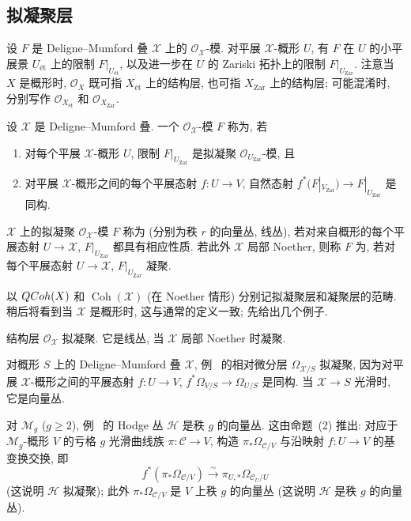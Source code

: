 \subsection{拟凝聚层}\label{src:5.1.3-subsection}
设 $F$ 是 Deligne--Mumford 叠 $\mathcal X$ 上的 $\mathcal O_{\mathcal X}$-模. 对平展 $\mathcal X$-概形 $U$, 有 $F$ 在 $U$ 的小平展景 $U_{\text{ét}}$ 上的限制 $F|_{U_{\text{ét}}}$, 以及进一步在 $U$ 的 Zariski 拓扑上的限制 $F|_{U_{\mathrm{Zar}}}$. 注意当 $X$ 是概形时, $\mathcal O_X$ 既可指 $X_{\text{ét}}$ 上的结构层, 也可指 $X_{\mathrm{Zar}}$ 上的结构层; 可能混淆时, 分别写作 $\mathcal O_{X_{\text{ét}}}$ 和 $\mathcal O_{X_{\mathrm{Zar}}}$.
\begin{definition}\label{src:5.1.17}
设 $\mathcal X$ 是 Deligne--Mumford 叠. 一个 $\mathcal O_{\mathcal X}$-模 $F$ 称为, 若
\begin{enumerate}[(1)]
\item 对每个平展 $\mathcal X$-概形 $U$, 限制 $F|_{U_{\mathrm{Zar}}}$ 是拟凝聚 $\mathcal O_{U_{\mathrm{Zar}}}$-模, 且
\item 对平展 $\mathcal X$-概形之间的每个平展态射 $f:U\to V$, 自然态射 $f^*(F|_{V_{\mathrm{Zar}}})\to F|_{U_{\mathrm{Zar}}}$ 是同构.
\end{enumerate}
$\mathcal X$ 上的拟凝聚 $\mathcal O_{\mathcal X}$-模 $F$ 称为 (分别为秩 $r$ 的向量丛, 线丛), 若对来自概形的每个平展态射 $U\to\mathcal X$, $F|_{U_{\mathrm{Zar}}}$ 都具有相应性质. 若此外 $\mathcal X$ 局部 Noether, 则称 $F$ 为, 若对每个平展态射 $U\to\mathcal X$, $F|_{U_{\mathrm{Zar}}}$ 凝聚.
\end{definition}
以 $QCoh(X)$ 和 $\operatorname{Coh}(\mathcal X)$ (在 Noether 情形) 分别记拟凝聚层和凝聚层的范畴. 稍后将看到当 $\mathcal X$ 是概形时, 这与通常的定义一致; 先给出几个例子.
\begin{example}\label{src:5.1.18}
结构层 $\mathcal O_{\mathcal X}$ 拟凝聚. 它是线丛, 当 $\mathcal X$ 局部 Noether 时凝聚.
\end{example}
\begin{example}\label{src:5.1.19}
对概形 $S$ 上的 Deligne--Mumford 叠 $\mathcal X$, 例~ 的相对微分层 $\Omega_{\mathcal X/S}$ 拟凝聚, 因为对平展 $\mathcal X$-概形之间的平展态射 $f:U\to V$, $f^*\Omega_{V/S}\to\Omega_{U/S}$ 是同构. 当 $\mathcal X\to S$ 光滑时, 它是向量丛.
\end{example}
\begin{example}\label{src:5.1.20}
对 $\mathcal M_g$ ($g\geq2$), 例~ 的 Hodge 丛 $\mathcal H$ 是秩 $g$ 的向量丛. 这由命题~(2) 推出: 对应于 $\mathcal M_g$-概形 $V$ 的亏格 $g$ 光滑曲线族 $\pi:\mathcal C\to V$, 构造 $\pi_*\Omega_{\mathcal C/V}$ 与沿映射 $f:U\to V$ 的基变换交换, 即
\[
f^*(\pi_*\Omega_{\mathcal C/V})\xrightarrow{\sim}\pi_{U,*}\Omega_{\mathcal C_U/U}
\]
(这说明 $\mathcal H$ 拟凝聚); 此外 $\pi_*\Omega_{\mathcal C/V}$ 是 $V$ 上秩 $g$ 的向量丛 (这说明 $\mathcal H$ 是秩 $g$ 的向量丛).
\end{example}
